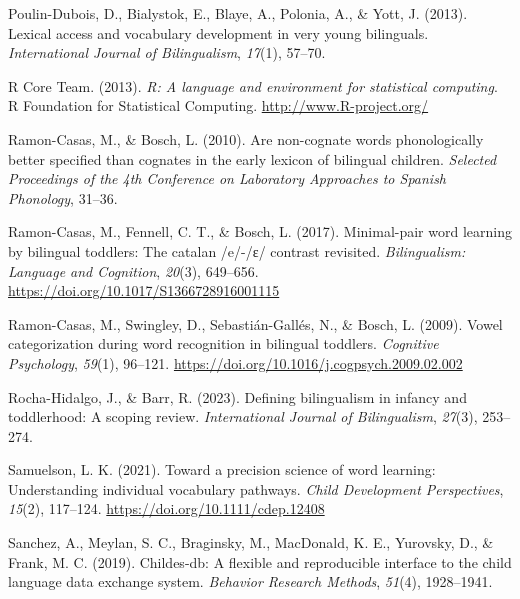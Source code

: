\documentclass[
]{article}
\newlength{\cslhangindent}
\newlength{\cslentryspacingunit} %
\newenvironment{CSLReferences}[2] %
 {%
  \setlength{\parindent}{0pt}
  \ifodd #1
  \let\oldpar\par
  \def\par{\hangindent=\cslhangindent\oldpar}
  \fi
  \setlength{\parskip}{#2\cslentryspacingunit}
 }%
 {}
\begin{document}
\begin{CSLReferences}{1}{0}
\leavevmode{}%
Poulin-Dubois, D., Bialystok, E., Blaye, A., Polonia, A., \& Yott, J.
(2013). Lexical access and vocabulary development in very young
bilinguals. \emph{International Journal of Bilingualism}, \emph{17}(1),
57--70.

\leavevmode{}%
R Core Team. (2013). \emph{R: A language and environment for statistical
computing}. R Foundation for Statistical Computing.
\url{http://www.R-project.org/}

\leavevmode{}%
Ramon-Casas, M., \& Bosch, L. (2010). Are non-cognate words
phonologically better specified than cognates in the early lexicon of
bilingual children. \emph{Selected Proceedings of the 4th Conference on
Laboratory Approaches to Spanish Phonology}, 31--36.

\leavevmode{}%
Ramon-Casas, M., Fennell, C. T., \& Bosch, L. (2017). Minimal-pair word
learning by bilingual toddlers: The catalan /e/-/ɛ/ contrast revisited.
\emph{Bilingualism: Language and Cognition}, \emph{20}(3), 649--656.
\url{https://doi.org/10.1017/S1366728916001115}

\leavevmode{}%
Ramon-Casas, M., Swingley, D., Sebastián-Gallés, N., \& Bosch, L.
(2009). Vowel categorization during word recognition in bilingual
toddlers. \emph{Cognitive Psychology}, \emph{59}(1), 96--121.
\url{https://doi.org/10.1016/j.cogpsych.2009.02.002}

\leavevmode{}%
Rocha-Hidalgo, J., \& Barr, R. (2023). Defining bilingualism in infancy
and toddlerhood: A scoping review. \emph{International Journal of
Bilingualism}, \emph{27}(3), 253--274.

\leavevmode{}%
Samuelson, L. K. (2021). Toward a precision science of word learning:
Understanding individual vocabulary pathways. \emph{Child Development
Perspectives}, \emph{15}(2), 117--124.
\url{https://doi.org/10.1111/cdep.12408}

\leavevmode{}%
Sanchez, A., Meylan, S. C., Braginsky, M., MacDonald, K. E., Yurovsky,
D., \& Frank, M. C. (2019). Childes-db: A flexible and reproducible
interface to the child language data exchange system. \emph{Behavior
Research Methods}, \emph{51}(4), 1928--1941.


\end{CSLReferences}
\end{document}
